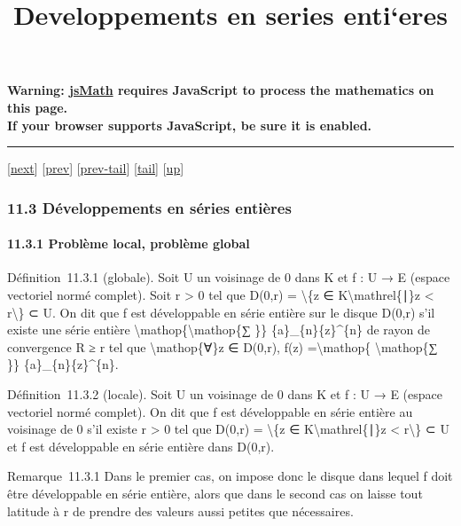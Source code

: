 \documentclass[]{article}
\title{Developpements en series enti`eres}
\author{}
\date{}
\begin{document}
\maketitle

\textbf{Warning: \href{http://www.math.union.edu/locate/jsMath}{jsMath}
requires JavaScript to process the mathematics on this page.\\ If your
browser supports JavaScript, be sure it is enabled.}

\begin{center}\rule{3in}{0.4pt}\end{center}

{[}\href{coursse66.html}{next}{]} {[}\href{coursse64.html}{prev}{]}
{[}\href{coursse64.html\#tailcoursse64.html}{prev-tail}{]}
{[}\hyperref[tailcoursse65.html]{tail}{]}
{[}\href{coursch12.html\#coursse65.html}{up}{]}

\subsubsection{11.3 Développements en séries entières}

\paragraph{11.3.1 Problème local, problème global}

Définition~11.3.1 (globale). Soit U un voisinage de 0 dans K et f : U →
E (espace vectoriel normé complet). Soit r \textgreater{} 0 tel que
D(0,r) = \textbackslash{}\{z ∈
K\textbackslash{}mathrel\{∣\}\textbar{}z\textbar{} \textless{}
r\textbackslash{}\} ⊂ U. On dit que f est développable en série entière
sur le disque D(0,r) s'il existe une série entière
\textbackslash{}mathop\{\textbackslash{}mathop\{∑ \}\}
\{a\}\_\{n\}\{z\}\^{}\{n\} de rayon de convergence R ≥ r tel que
\textbackslash{}mathop\{∀\}z ∈ D(0,r), f(z) =\textbackslash{}mathop\{
\textbackslash{}mathop\{∑ \}\} \{a\}\_\{n\}\{z\}\^{}\{n\}.

Définition~11.3.2 (locale). Soit U un voisinage de 0 dans K et f : U → E
(espace vectoriel normé complet). On dit que f est développable en série
entière au voisinage de 0 s'il existe r \textgreater{} 0 tel que D(0,r)
= \textbackslash{}\{z ∈
K\textbackslash{}mathrel\{∣\}\textbar{}z\textbar{} \textless{}
r\textbackslash{}\} ⊂ U et f est développable en série entière dans
D(0,r).

Remarque~11.3.1 Dans le premier cas, on impose donc le disque dans
lequel f doit être développable en série entière, alors que dans le
second cas on laisse tout latitude à r de prendre des valeurs aussi
petites que nécessaires.
\end{document}

